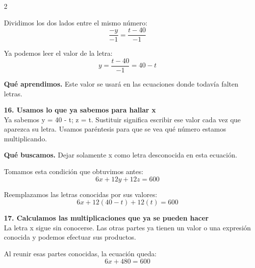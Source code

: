 \documentclass[11pt,a4paper,landscape]{article}
\begin{document}
\begin{multicols*}{2}
\begin{minipage}{\linewidth}
\par\smallskip Dividimos los dos lados entre el mismo número:
\[\frac{-y}{-1}=\frac{t - 40}{-1}\]
\par\smallskip Ya podemos leer el valor de la letra:
\[y=\frac{t - 40}{-1}=40 - t\]
\par\smallskip\textbf{Qué aprendimos.} Este valor se usará en las ecuaciones donde todavía falten letras.
\end{minipage}\par\medskip
\noindent\begin{minipage}{\linewidth}\textbf{16. Usamos lo que ya sabemos para hallar x}\\[2pt]Ya sabemos y = 40 - t; z = t. Sustituir significa escribir ese valor cada vez que aparezca su letra. Usamos paréntesis para que se vea qué número estamos multiplicando.
\par\smallskip\textbf{Qué buscamos.} Dejar solamente x como letra desconocida en esta ecuación.
\par\smallskip Tomamos esta condición que obtuvimos antes:
\[6x + 12y + 12z = 600\]
\par\smallskip Reemplazamos las letras conocidas por sus valores:
\[6x + 12\left(40 - t\right) + 12\left(t\right)=600\]
\end{minipage}\par\medskip
\noindent\begin{minipage}{\linewidth}\textbf{17. Calculamos las multiplicaciones que ya se pueden hacer}\\[2pt]La letra x sigue sin conocerse. Las otras partes ya tienen un valor o una expresión conocida y podemos efectuar sus productos.
\par{}\par\smallskip
\par\smallskip Al reunir esas partes conocidas, la ecuación queda:
\[6x + 480=600\]
\end{minipage}\par\medskip

\end{multicols*}
\end{document}
